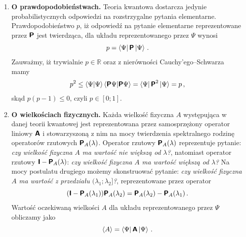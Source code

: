 \documentclass{myclass}
\begin{document}
\begin{enumerate}[label=\Roman*.]
    \item \textbf{O prawdopodobieństwach.} Teoria kwantowa dostarcza jedynie probabilistycznych
    odpowiedzi na rozstrzygalne pytania elementarne. Prawdopodobieństwo \(p\), iż odpowiedź na
    pytanie elementarne reprezentowane przez \(\boldsymbol{\mathsf{P}}\) jest twierdząca, dla układu
    reprezentowanego przez \(\Psi\) wynosi
    \begin{equation*}
        p = \bra{\Psi}\boldsymbol{\mathsf{P}}\ket{\Psi}\,.
    \end{equation*}
    Zauważmy, iż trywialnie \(p\in\mathbb{R}\) oraz z nierówności Cauchy'ego--Schwarza mamy
    \begin{equation*}
        p^2 \leq \braket{\Psi} \braket{\boldsymbol{\mathsf{P}}\Psi} = \bra{\Psi}\boldsymbol{\mathsf{P}}^2\ket{\Psi} = p\,,
    \end{equation*}
    skąd \(p(p-1) \leq 0\), czyli \(p \in [0;1]\).

    \item \textbf{O wielkościach fizycznych.} Każda wielkość fizyczna \(A\) występująca w danej
    teorii kwantowej jest reprezentowana przez samosprzężony operator liniowy \(\boldsymbol{\mathsf{A}}\) i
    stowarzyszoną z nim na mocy twierdzenia spektralnego rodzinę operatorów rzutowych
    \(\boldsymbol{\mathsf{P}}_A(\lambda)\). Operator rzutowy \(\boldsymbol{\mathsf{P}}_A(\lambda)\) reprezentuje pytanie:
    \textit{czy wielkość fizyczna \(A\) ma wartość nie większą od \(\lambda\)?}, natomiast operator
    rzutowy \(\boldsymbol{\mathsf{I}}-\boldsymbol{\mathsf{P}}_A(\lambda)\): \textit{czy wielkość fizyczna \(A\) ma wartość większą
    od \(\lambda\)?} Na mocy postulatu drugiego możemy skonstruować pytanie: \textit{czy wielkość
    fizyczna \(A\) ma wartość z przedziału \((\lambda_1;\lambda_2]\)?}, reprezentowane przez
    operator 
    \begin{equation*}
        (\boldsymbol{\mathsf{I}} - \boldsymbol{\mathsf{P}}_A(\lambda_1))\boldsymbol{\mathsf{P}}_A(\lambda_2) =
        \boldsymbol{\mathsf{P}}_A(\lambda_2)-\boldsymbol{\mathsf{P}}_A(\lambda_1)\,.
    \end{equation*}
    Wartość oczekiwaną wielkości \(A\) dla układu reprezentowanego przez \(\Psi\) obliczamy jako
    \begin{equation*}
        \langle A \rangle = \bra{\Psi}\boldsymbol{\mathsf{A}}\ket{\Psi}\,.
    \end{equation*}


\end{enumerate}
\end{document}
